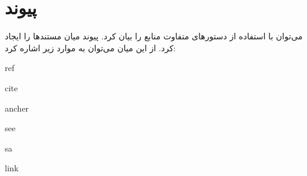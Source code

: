 

\section{پیوند}


می‌توان با استفاده از دستورهای متفاوت منابع را بیان کرد. پیوند میان مستندها را
ایجاد کرد. از این میان می‌توان به موارد زیر اشاره کرد:

ref

cite

ancher

see

sa

link


